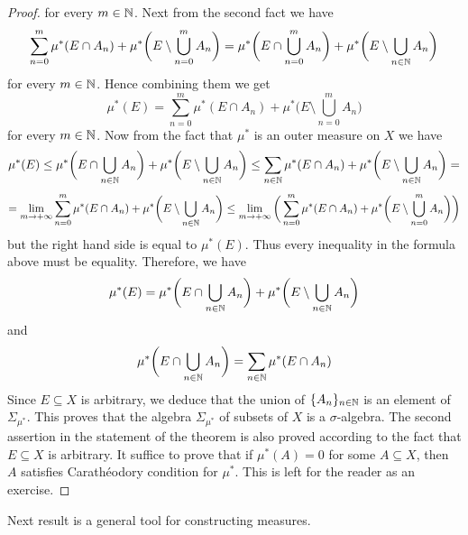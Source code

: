 \begin{proof}
for every $m\in {\mathbb N}$. Next from the second fact we have
$$\sum_{n=0}^m\mu^*(E\cap A_n) + \mu^*\bigg(E\setminus \bigcup_{n=0}^mA_n\bigg) = \mu^*\bigg(E\cap \bigcup_{n=0}^mA_n\bigg) + \mu^*\bigg(E\setminus \bigcup_{n\in {\mathbb N}}A_n\bigg)$$
for every $m\in {\mathbb N}$. Hence combining them we get
$$\mu^*(E) = \sum_{n=0}^m\mu^*(E\cap A_n) + \mu^*\bigg(E\setminus \bigcup_{n=0}^mA_n\bigg)$$
for every $m\in {\mathbb N}$. Now from the fact that $\mu^*$ is an outer measure on $X$ we have
$$\mu^*(E) \leq \mu^*\bigg(E\cap \bigcup_{n\in {\mathbb N}}A_n\bigg) + \mu^*\bigg(E\setminus \bigcup_{n\in {\mathbb N}}A_n\bigg) \leq \sum_{n\in {\mathbb N}}\mu^*(E\cap A_n) + \mu^*\bigg(E\setminus \bigcup_{n\in {\mathbb N}}A_n\bigg) = $$
$$= \lim_{m\rightarrow +\infty}\sum_{n=0}^m\mu^*(E\cap A_n) + \mu^*\bigg(E\setminus \bigcup_{n\in {\mathbb N}}A_n\bigg) \leq \lim_{m\rightarrow +\infty}\bigg(\sum_{n=0}^m\mu^*(E\cap A_n) + \mu^*\bigg(E\setminus \bigcup_{n=0}^mA_n\bigg)\bigg)$$
but the right hand side is equal to $\mu^*(E)$. Thus every inequality in the formula above must be equality. Therefore, we have
$$\mu^*(E) = \mu^*\bigg(E\cap \bigcup_{n\in {\mathbb N}}A_n\bigg) + \mu^*\bigg(E\setminus \bigcup_{n\in {\mathbb N}}A_n\bigg)$$
and
$$\mu^*\bigg(E\cap \bigcup_{n\in {\mathbb N}}A_n\bigg) = \sum_{n\in {\mathbb N}}\mu^*(E\cap A_n)$$
Since $E\subseteq X$ is arbitrary, we deduce that the union of $\{A_n\}_{n\in {\mathbb N}}$ is an element of $\Sigma_{\mu^*}$. This proves that the algebra $\Sigma_{\mu^*}$ of subsets of $X$ is a $\sigma$-algebra. The second assertion in the statement of the theorem is also proved according to the fact that $E\subseteq X$ is arbitrary. It suffice to prove that if $\mu^*(A) = 0$ for some $A\subseteq X$, then $A$ satisfies Carath{\'e}odory condition for $\mu^*$. This is left for the reader as an exercise.
\end{proof}
\noindent
Next result is a general tool for constructing measures.


